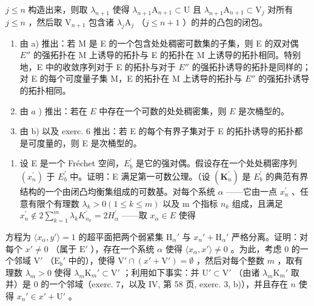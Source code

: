 \(j \leqslant n\) 构造出来，则取 \(\lambda_{n+1}\) 使得 \(\lambda_{n+1}\mathrm{A}_{n+1} \subset \mathrm{U}\) 且 \(\lambda_{n+1}\mathrm{A}_{n+1} \subset \mathrm{V}_j\) 对所有 \(j \leqslant n\) ，然后取 \(\mathrm{V}_{n+1}\) 包含诸 \(\lambda_j\mathrm{A}_j\) （\(j \leqslant n + 1\) ）的并的凸包的闭包。

\begin{enumerate}
\def\labelenumi{\alph{enumi})}
\setcounter{enumi}{1}
\item
  由 a) 推出：若 M 是 E 的一个包含处处稠密可数集的子集，则 E 的双对偶 \(E''\) 的强拓扑在 M 上诱导的拓扑与 E 的拓扑在 M 上诱导的拓扑相同。特别地，E 中的收敛序列对于 E 的拓扑与对于 \(E''\) 的强拓扑诱导的拓扑是同样的；对 E 的每个可度量子集 M，E 的拓扑在 M 上诱导的拓扑与 \(E''\) 的强拓扑诱导的拓扑相同。
\item
  由 \(a\) ) 推出：若在 \(E\) 中存在一个可数的处处稠密集，则 \(E\) 是次桶型的。
\item
  由 b) 以及 exerc. 6 推出：若 E 的每个有界子集对于 E 的拓扑诱导的拓扑都是可度量的，则 E 是次桶型的。
\end{enumerate}

\begin{enumerate}
\def\labelenumi{\arabic{enumi})}
\setcounter{enumi}{7}
\tightlist
\item
  设 E 是一个 Fréchet 空间，\(E_{b}^{\prime}\) 是它的强对偶。假设存在一个处处稠密序列 \((x_{n}^{\prime})\) 于 \(E_{b}^{\prime}\) 中。证明：E 满足第一可数公理。（设 \((\mathbf{K}_{n}^{\prime})\) 是 \(E_{b}^{\prime}\) 的典范有界结构的一个由闭凸均衡集组成的可数基。对每个系统 \(\alpha\) ——它由一点 \(x_{n}^{\prime}\) 、任意有限个有理数 \(\lambda_{k} > 0 (1 \leqslant k \leqslant m)\) 以及 m 个指标 \(n_{k}\) 组成，且满足 \(x_{n}^{\prime} \notin 2 \sum_{k=1}^{m} \lambda_{k} K_{n_{k}}^{\prime} = 2 H_{\alpha}^{\prime}\) ——取 \(x_{\alpha} \in E\) 使得
\end{enumerate}

方程为 \(\langle x_{\alpha}, y' \rangle = 1\) 的超平面把两个弱紧集 \(\mathrm{H}_{\alpha}'\) 与 \(x_{n}' + \mathrm{H}_{\alpha}'\) 严格分离。证明：对每个 \(x' \neq 0\) （属于 \(\mathrm{E}'\) ），存在一个系统 \(\alpha\) 使得 \(\langle x_{\alpha}, x' \rangle \neq 0\) 。为此，考虑 0 的一个邻域 \(\mathrm{V}'\) （\(\mathrm{E}_b'\) 中的），使得 \(\mathrm{V}' \cap (x' + \mathrm{V}') = \emptyset\) ，然后对每个整数 \(m\) ，取有理数 \(\lambda_m > 0\) 使得 \(\lambda_m \mathrm{K}_m' \subset \mathrm{V}'\) ；利用如下事实：并 \(\mathrm{U}' \subset \mathrm{V}'\) （由诸 \(\lambda_m \mathrm{K}_m'\) 取并）是 0 的一个邻域（exerc. 7，以及 IV, 第 58 页, exerc. 3, b)），并且存在 \(n\) 使得 \(x_n' \in x' + \mathrm{U}'\) 。

